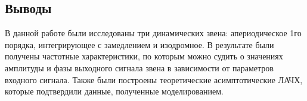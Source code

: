 \documentclass[a4paper,12pt]{article}
\begin{document}
	\clearpage
	\begin{center}
	\section{Выводы}
	\end{center}
	
	В данной работе были исследованы три динамических звена: апериодическое 1го порядка, интегрирующее с замедлением и изодромное. В результате были получены частотные характеристики, по которым можно судить о значениях амплитуды и фазы выходного сигнала звена в зависимости от параметров входного сигнала. Также были построены теоретические асимптотические ЛАЧХ, которые подтвердили данные, полученные моделированием.
\end{document}
